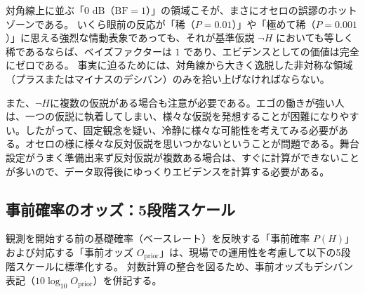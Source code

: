 
対角線上に並ぶ「$0\text{ dB}$（$\mathrm{BF} = 1$）」の領域こそが、まさにオセロの誤謬のホットゾーンである。
いくら眼前の反応が「稀（$P=0.01$）」や「極めて稀（$P=0.001$）」に思える強烈な情動表象であっても、それが基準仮説 $\neg H$ においても等しく稀であるならば、ベイズファクターは $1$ であり、エビデンスとしての価値は完全にゼロである。
事実に迫るためには、対角線から大きく逸脱した非対称な領域（プラスまたはマイナスのデシバン）のみを拾い上げなければならない。

また、$\neg H$に複数の仮説がある場合も注意が必要である。エゴの働きが強い人は、一つの仮説に執着してしまい、様々な仮説を発想することが困難になりやすい。したがって、固定観念を疑い、冷静に様々な可能性を考えてみる必要がある。オセロの様に様々な反対仮説を思いつかないということが問題である。舞台設定がうまく準備出来ず反対仮説が複数ある場合は、すぐに計算ができないことが多いので、データ取得後にゆっくりエビデンスを計算する必要がある。

\subsection{事前確率のオッズ：5段階スケール}

観測を開始する前の基礎確率（ベースレート）を反映する「事前確率 $P(H)$」および対応する「事前オッズ $O_{\mathrm{prior}}$」は、現場での運用性を考慮して以下の5段階スケールに標準化する。
対数計算の整合を図るため、事前オッズもデシバン表記（$10 \log_{10} O_{\mathrm{prior}}$）を併記する。


